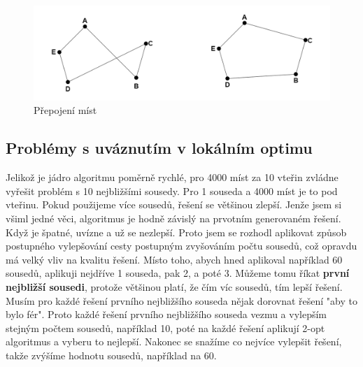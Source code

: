 \begin{figure}[H]
\includegraphics[width=15cm]{obrazky-figures/change_points.png}
\caption{Přepojení míst}
\label{fig:Places changed}
\end{figure}

\subsection{Problémy s uváznutím v lokálním optimu}\label{sec:loc min}
Jelikož je jádro algoritmu poměrně rychlé, pro 4000 míst za 10 vteřin zvládne vyřešit problém s 10 nejbližšími sousedy. Pro 1 souseda a 4000 míst je to pod vteřinu. Pokud použijeme více sousedů, řešení se většinou zlepší. Jenže jsem si všiml jedné věci, algoritmus je hodně závislý na prvotním generovaném řešení. Když je špatné, uvízne a už se nezlepší. Proto jsem se rozhodl aplikovat způsob postupného vylepšování cesty postupným zvyšováním počtu sousedů, což opravdu má velký vliv na kvalitu řešení. Místo toho, abych hned aplikoval například 60 sousedů, aplikuji nejdříve 1 souseda, pak 2, a poté 3. Můžeme tomu říkat \textbf{první nejbližší sousedi}, protože většinou platí, že čím víc sousedů, tím lepší řešení. Musím pro každé řešení prvního nejbližšího souseda nějak dorovnat řešení "aby to bylo fér". Proto každé řešení prvního nejbližšího souseda vezmu a vylepším stejným počtem sousedů, například 10, poté na každé řešení aplikují 2-opt algoritmus a vyberu to nejlepší. Nakonec se snažíme co nejvíce vylepšit řešení, takže zvýšíme hodnotu sousedů, například na 60.
